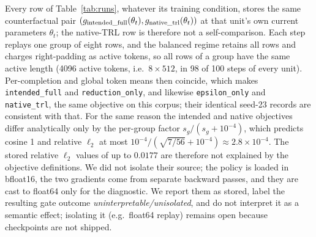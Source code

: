 \documentclass{article}
\begin{document}
Every row of Table~\ref{tab:runs}, whatever its training condition, stores the
same counterfactual pair $(g_{\rm intended\_full}(\theta_t),
g_{\rm native\_trl}(\theta_t))$ at that unit's own current parameters
$\theta_t$; the native-TRL row is therefore not a self-comparison.  Each step
replays one group of eight rows, and the balanced regime retains all rows and
charges right-padding as active tokens, so all rows of a group have the same
active length (4096 active tokens, i.e.\ $8\times512$, in 98 of 100 steps of
every unit).  Per-completion and global token means then coincide, which makes
\texttt{intended\_full} and \texttt{reduction\_only}, and likewise
\texttt{epsilon\_only} and \texttt{native\_trl}, the same objective on this
corpus; their identical seed-23 records are consistent with that.  For the
same reason the intended and native objectives differ analytically only by the
per-group factor $s_g/(s_g+10^{-4})$, which predicts cosine 1 and relative
$\ell_2$ at most $10^{-4}/(\sqrt{7/56}+10^{-4})\approx2.8\times10^{-4}$.  The
stored relative $\ell_2$ values of up to $0.0177$ are therefore not explained by
the objective definitions.  We did not isolate their source; the policy is
loaded in bfloat16, the two gradients come from separate backward passes, and
they are cast to float64 only for the diagnostic.  We report them as stored,
label the resulting gate outcome \emph{uninterpretable/unisolated}, and do
not interpret it as a semantic effect; isolating it (e.g.\ float64 replay)
remains open because checkpoints are not shipped.
\end{document}
